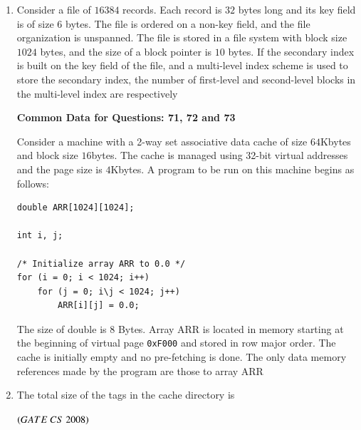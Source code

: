 \documentclass[journal]{IEEEtran}
\numberwithin{equation}{enumi}
\numberwithin{figure}{enumi}
\begin{document}
\begin{enumerate}
\item Consider a file of $16384$ records. Each record is $32$ bytes long and its key field is of size $6$ bytes. The file is ordered on a non-key field, and the file organization is
unspanned. The file is stored in a file system with block size $1024$ bytes, and the size of a block pointer is $10$ bytes. If the secondary index is built on the key field
of the file, and a multi-level index scheme is used to store the secondary index, the number of first-level and second-level blocks in the multi-level index are respectively
\begin{enumerate} 
\end{enumerate}
\begin{center}
\textbf{Common Data for Questions: 71, 72 and 73}  
\end{center}
Consider a machine with a 2-way set associative data cache of size $64$Kbytes and block size $16$bytes.
The cache is managed using 32-bit virtual addresses and the page size is $4$Kbytes.  
A program to be run on this machine begins as follows:  

\begin{verbatim}
double ARR[1024][1024];

int i, j;

/* Initialize array ARR to 0.0 */
for (i = 0; i < 1024; i++)
    for (j = 0; i\j < 1024; j++)
        ARR[i][j] = 0.0;
\end{verbatim}

The size of double is $8$ Bytes.  
Array ARR is located in memory starting at the beginning of virtual page \texttt{0xF000}  
and stored in row major order.  
The cache is initially empty and no pre-fetching is done.  
The only data memory references made by the program are those to array ARR \\
\item The total size of the tags in the cache directory is
\begin{enumerate} 
\end{enumerate}
\hfill $\left(GATE\ CS\  2008\right)$


\end{enumerate}
\end{document}
